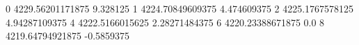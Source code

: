 0 4229.56201171875 9.328125
1 4224.70849609375 4.474609375
2 4225.1767578125 4.94287109375
4 4222.5166015625 2.28271484375
6 4220.23388671875 0.0
8 4219.64794921875 -0.5859375
